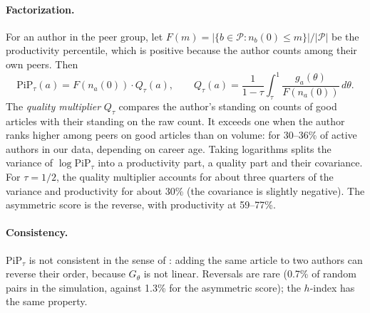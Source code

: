 \paragraph{Factorization.} For an author in the peer group, let $F(m) = |\{b \in \mathcal{P}: n_b(0) \le m\}|/|\mathcal{P}|$
be the productivity percentile, which is positive because the author counts among their own peers. Then
\begin{equation}
\mathrm{PiP}_\tau(a) = F\!\left(n_a(0)\right) \cdot Q_\tau(a), \qquad
Q_\tau(a) = \frac{1}{1-\tau} \int_\tau^1 \frac{g_a(\theta)}{F\!\left(n_a(0)\right)}\, d\theta .
\end{equation}
The \emph{quality multiplier} $Q_\tau$ compares the author's standing on counts of good articles with their standing on
the raw count. It exceeds one when the author ranks higher among peers on good articles than on volume: for 30--36\% of active
authors in our data, depending on career age. Taking logarithms splits the variance of $\log \mathrm{PiP}_\tau$ into a
productivity part, a quality part and their covariance. For $\tau = 1/2$, the quality multiplier accounts for about
three quarters of the variance and productivity for about 30\% (the covariance is slightly negative). The asymmetric
score is the reverse, with productivity at 59--77\%.

\paragraph{Consistency.} $\mathrm{PiP}_\tau$ is not consistent in the sense of \cite{waltman2012inconsistency}: adding
the same article to two authors can reverse their order, because $G_\theta$ is not linear. Reversals are rare (0.7\% of
random pairs in the simulation, against 1.3\% for the asymmetric score); the $h$-index has the same property.

